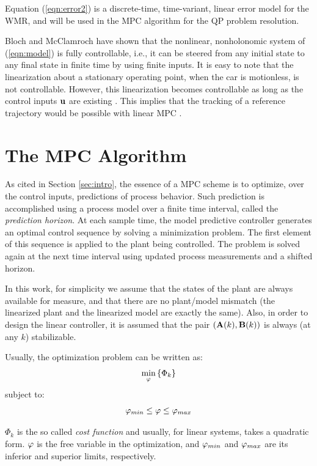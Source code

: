 \documentclass[twocolumn]{IEEEtran} %
\begin{document}
Equation (\ref{eqn:error2}) is a discrete-time, time-variant, linear error model for the WMR, and will be used in the MPC algorithm for the QP problem resolution.

Bloch and McClamroch \cite{bloch89} have shown that the nonlinear, nonholonomic system of (\ref{eqn:model}) is fully controllable, i.e., it can be steered from any initial state to any final state in finite time by using finite inputs. It is easy to note that the linearization about a stationary operating point, when the car is motionless, is not controllable. However, this linearization becomes controllable as long as the control inputs ${\bf u}$ are existing \cite{samson91}. This implies that the tracking of a reference trajectory would be possible with linear MPC \cite{essen01}.


\section{The MPC Algorithm}\label{sec:mpc}
As cited in Section \ref{sec:intro}, the essence of a MPC scheme is to optimize, over the control inputs, predictions of process behavior. Such prediction is accomplished using a process model over a finite time interval, called the {\em prediction horizon}. At each sample time, the model predictive controller generates an optimal control sequence by solving a minimization problem. The first element of this sequence is applied to the plant being controlled. The problem is solved again at the next time interval using updated process measurements and a shifted horizon.

In this work, for simplicity we assume that the states of the plant are always available for measure, and that there are no plant/model mismatch (the linearized plant and the linearized model are exactly the same). Also, in order to design the linear controller, it is assumed that the pair $({\bf A}(k),{\bf B}(k))$ is always (at any $k$) stabilizable.

Usually, the optimization problem can be written as:
\begin{equation*}
	\min_{\bf\varphi}\left\{\Phi_k\right\}
\end{equation*}
subject to:
\begin{equation*}\label{eqn:constr}
	{\bf\varphi}_{min} \leq {\bf\varphi} \leq {\bf\varphi}_{max}
\end{equation*}

$\Phi_k$ is the so called {\em cost function} and usually, for linear systems, takes a quadratic form. ${\bf\varphi}$ is the free variable in the optimization, and ${\bf\varphi}_{min}$ and ${\bf\varphi}_{max}$ are its inferior and superior limits, respectively.
\end{document}
